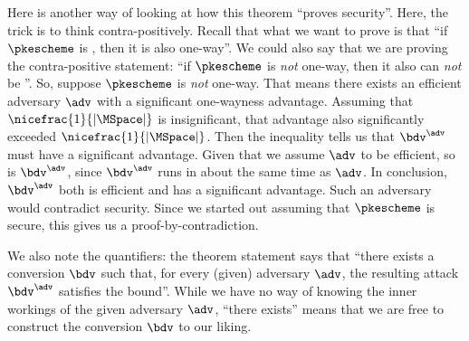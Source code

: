 {	      Here is another way of looking at how this theorem ``proves security''.
	      	Here, the trick is to think contra-positively.
	      	Recall that what we want to prove is that ``if $\pkescheme$ is \indcpa, then it is also one-way''.
	        We could also say that we are proving the contra-positive statement:
	        ``if $\pkescheme$ is \emph{not} one-way, then it also can \emph{not} be \indcpa''.
	        So, suppose $\pkescheme$ is \emph{not} one-way.
	        That means there exists an efficient adversary $\adv$ with a significant one-wayness advantage.
	        Assuming that $\nicefrac{1}{|\MSpace|}$ is insignificant,
	        that advantage also significantly exceeded $\nicefrac{1}{|\MSpace|}$.
	        Then the inequality tells us that $\bdv^{\adv}$ must have a significant \indcpa advantage.
	        Given that we assume $\adv$ to be efficient, so is $\bdv^{\adv}$,
	        since $\bdv^{\adv}$ runs in about the same time as $\adv$.
	        In conclusion, $\bdv^{\adv}$ both is efficient and has a significant \indcpa advantage.
	        Such an adversary would contradict \indcpa security.        
	        Since we started out assuming that $\pkescheme$ is \indcpa secure, 
	        this gives us a proof-by-contradiction.
	        
	        We also note the quantifiers: the theorem statement says that
			``there exists a conversion $\bdv$ such that, for every (given) adversary $\adv$, 
			the resulting attack $\bdv^\adv$ satisfies the bound''.
			While we have no way of knowing the inner workings of the given adversary $\adv$,
			``there exists'' means that we are free to construct the conversion $\bdv$ to our liking. 
	}


    
